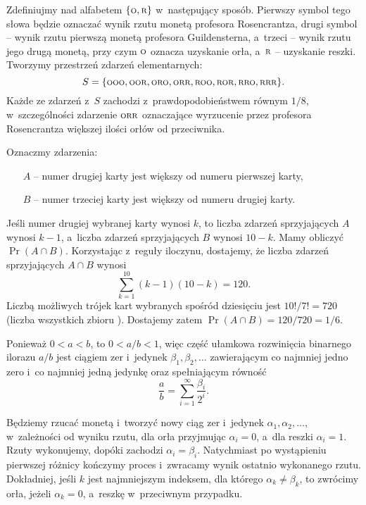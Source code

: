 \exercise %
Zdefiniujmy  nad alfabetem $\{{\scriptstyle\rm O},{\scriptstyle\rm R}\}$ w~następujący sposób.
Pierwszy symbol tego słowa będzie oznaczać wynik rzutu monetą profesora Rosencrantza, drugi symbol -- wynik rzutu pierwszą monetą profesora Guildensterna, a~trzeci -- wynik rzutu jego drugą monetą, przy czym $\scriptstyle\rm O$ oznacza uzyskanie orła, a~$\scriptstyle\rm R$ -- uzyskanie reszki.
Tworzymy przestrzeń zdarzeń elementarnych:
\[
	S = \{{\scriptstyle\rm OOO},{\scriptstyle\rm OOR},{\scriptstyle\rm ORO},{\scriptstyle\rm ORR},{\scriptstyle\rm ROO},{\scriptstyle\rm ROR},{\scriptstyle\rm RRO},{\scriptstyle\rm RRR}\}.
\]
Każde ze zdarzeń z~$S$ zachodzi z~prawdopodobieństwem równym $1/8$, w~szczególności zdarzenie $\scriptstyle\rm ORR$ oznaczające wyrzucenie przez profesora Rosencrantza większej ilości orłów od przeciwnika.

\exercise %
Oznaczmy zdarzenia:
\begin{itemize}
	\item[$A$] -- numer drugiej karty jest większy od numeru pierwszej karty,
	\item[$B$] -- numer trzeciej karty jest większy od numeru drugiej karty.
\end{itemize}
Jeśli numer drugiej wybranej karty wynosi $k$, to liczba zdarzeń sprzyjających $A$ wynosi $k-1$, a~liczba zdarzeń sprzyjających $B$ wynosi $10-k$.
Mamy obliczyć $\Pr(A\cap B)$.
Korzystając z~reguły iloczynu, dostajemy, że liczba zdarzeń sprzyjających $A\cap B$ wynosi
\[
    \sum_{k=1}^{10}(k-1)(10-k) = 120.
\]
Liczbą możliwych trójek kart wybranych spośród dziesięciu jest $10!/7!=720$ (liczba wszystkich  zbioru ).
Dostajemy zatem $\Pr(A\cap B)=120/720=1/6$.

\exercise %
Ponieważ $0<a<b$, to $0<a/b<1$, więc część ułamkowa rozwinięcia binarnego ilorazu $a/b$ jest ciągiem zer i~jedynek $\beta_1,\beta_2,\dots$ zawierającym co najmniej jedno zero i~co najmniej jedną jedynkę oraz spełniającym równość
\[
    \frac{a}{b} = \sum_{i=1}^\infty\frac{\beta_i}{2^i}.
\]

Będziemy rzucać monetą i~tworzyć nowy ciąg zer i~jedynek $\alpha_1,\alpha_2,\dots$, w~zależności od wyniku  rzutu, dla orła przyjmując $\alpha_i=0$, a~dla reszki $\alpha_i=1$.
Rzuty wykonujemy, dopóki zachodzi $\alpha_i=\beta_i$.
Natychmiast po wystąpieniu pierwszej różnicy kończymy proces i~zwracamy wynik ostatnio wykonanego rzutu.
Dokładniej, jeśli $k$ jest najmniejszym indeksem, dla którego $\alpha_k\ne\beta_k$, to zwrócimy orła, jeżeli $\alpha_k=0$, a~reszkę w~przeciwnym przypadku.

